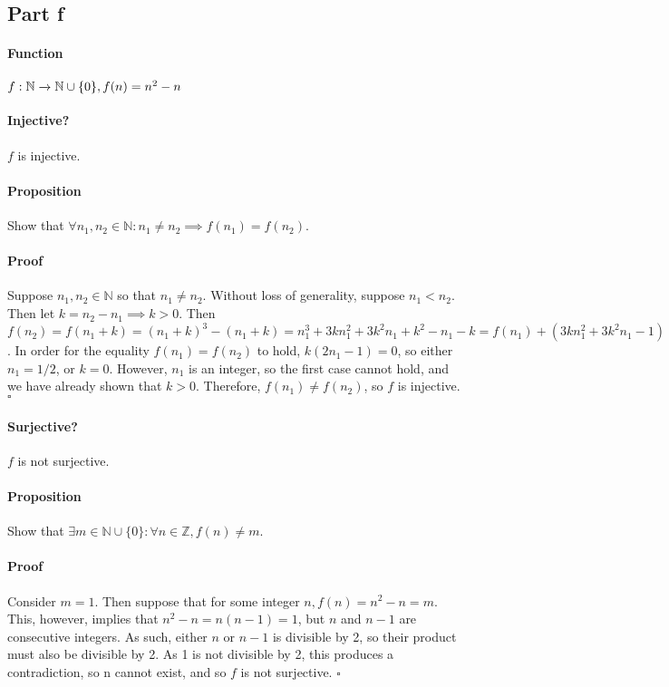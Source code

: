 \documentclass{article}
\begin{document}
\subsection{Part f}
{
\paragraph{Function}$f:\mathbb{N}\xrightarrow{}{\mathbb{N}\cup\{0\}}, f(n)=n^2-n$
{
	\paragraph{Injective?}
	$f$ is injective.
	\vspace{-10pt}
	\paragraph{Proposition}
	Show that $\forall n_1, n_2 \in \mathbb{N}: n_1 \neq n_2 \implies f(n_1) = f(n_2)$.
	\vspace{-10pt}
	\paragraph{Proof}
	Suppose $n_1, n_2 \in \mathbb{N}$ so that $n_1 \neq n_2$. Without loss of generality, suppose $n_1 < n_2$. Then let $k = n_2-n_1 \implies k > 0$. Then $f(n_2) = f(n_1+k) = (n_1+k)^3-(n_1+k) = n_1^3+3kn_1^2+3k^2n_1+k^2-n_1-k = f(n_1)+(3kn_1^2+3k^2n_1-1)$. In order for the equality $f(n_1) = f(n_2)$ to hold, $k(2n_1-1) = 0$, so either $n_1 = 1/2$, or $k = 0$. However, $n_1$ is an integer, so the first case cannot hold, and we have already shown that $k > 0$. Therefore, $f(n_1) \neq f(n_2)$, so $f$ is injective. $\square$
}
{
	\paragraph{Surjective?}
	$f$ is not surjective.
	\vspace{-10pt}
	\paragraph{Proposition}
	Show that $\exists m \in \mathbb{N}\cup \{0\}: \forall n \in \mathbb{Z}, f(n) \neq m$.
	\vspace{-10pt}
	\paragraph{Proof}
	Consider $m=1$. Then suppose that for some integer $n, f(n) = n^2-n = m$. This, however, implies that $n^2-n = n(n-1) = 1$, but $n$ and $n-1$ are consecutive integers. As such, either $n$ or $n-1$ is divisible by 2, so their product must also be divisible by 2. As 1 is not divisible by 2, this produces a contradiction, so n cannot exist, and so $f$ is not surjective. $\square$
}
{
}}
\end{document}
